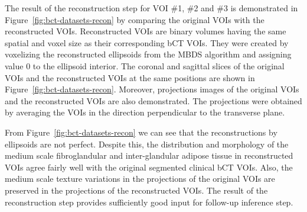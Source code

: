 \documentclass[journal]{IEEEtran}
\begin{document}
The result of the reconstruction step for VOI \#1, \#2 and \#3 is
demonstrated in Figure~\ref{fig:bct-datasets-recon} by comparing the
original VOIs with the reconstructed VOIs. Reconstructed VOIs are
binary volumes having the same spatial and voxel size as their
corresponding bCT VOIs. They were created by voxelizing the
reconstructed ellipsoids from the MBDS algorithm and assigning value 0
to the ellipsoid interior. The coronal and sagittal slices of the
original VOIs and the reconstructed VOIs at the same positions are
shown in Figure~\ref{fig:bct-datasets-recon}. Moreover, projections
images of the original VOIs and the reconstructed VOIs are also
demonstrated. The projections were obtained by averaging the VOIs in
the direction perpendicular to the transverse plane.

From Figure~\ref{fig:bct-datasets-recon} we can see that the
reconstructions by ellipsoids are not perfect. Despite this, the
distribution and morphology of the medium scale fibroglandular and
inter-glandular adipose tissue in reconstructed VOIs agree fairly well
with the original segmented clinical bCT VOIs. Also, the medium scale
texture variations in the projections of the original VOIs are
preserved in the projections of the reconstructed VOIs. The result of
the reconstruction step provides sufficiently good input for follow-up
inference step.
\end{document}
